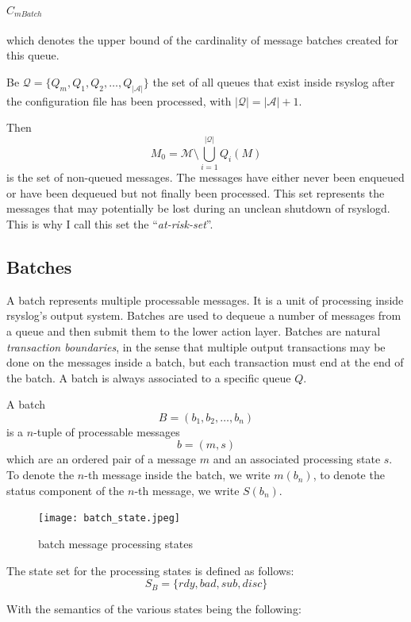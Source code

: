 \documentclass[a4paper,10pt]{article}
\newcommand{\MM}{\mathcal{M}}
\newcommand{\QQ}{\mathcal{Q}}
\newcommand{\AAA}{\mathcal{A}}
\begin{document}
\paragraph{$C_{mBatch}$} which denotes the upper bound of the cardinality of message batches created for this queue.

Be $\QQ = \{Q_m, Q_1, Q_2, \ldots, Q_{|\AAA|}\}$ the set of all queues that exist inside rsyslog after the configuration file has been processed, with $|\QQ| = |\AAA| + 1$.

Then
$$M_0 = \MM \setminus \bigcup_{i=1}^{|\QQ|} Q_i(M)$$
is the set of non-queued messages. The messages have either never been enqueued or have been dequeued but not finally been processed. This set represents the messages that may potentially be lost during an unclean shutdown of rsyslogd. This is why I call this set the ``\emph{at-risk-set}''.


\subsection{Batches}
A batch represents multiple processable messages. It is a unit of processing inside rsyslog's output system. Batches are used to dequeue a number of messages from a queue and then submit them to the lower action layer. Batches are natural \emph{transaction boundaries}, in the sense that multiple output transactions may be done on the messages inside a batch, but each transaction must end at the end of the batch. A batch is always associated to a specific queue $Q$.

A batch
$$B = (b_1, b_2, \ldots, b_n )$$
is a $n$-tuple of processable messages
$$b = (m, s)$$
which are an ordered pair of a message $m$ and an associated processing state $s$. To denote the $n$-th message inside the batch, we write $m(b_n)$, to denote the status component of the $n$-th message, we write $S(b_n)$.

\begin{figure}
\begin{center}
\texttt{[image: batch\_state.jpeg]}
\end{center}
\caption{batch message processing states}
\label{fig_batchmsg_states}
\end{figure}

The state set for the processing states is defined as follows:
$$
S_B = \{ rdy, bad, sub, disc \}
$$

With the semantics of the various states being the following:
\end{document}
